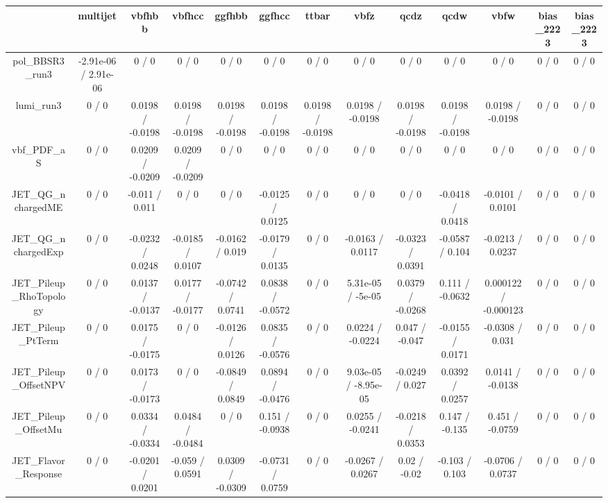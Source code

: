 \documentclass[10pt]{article}
\begin{document}
\begin{table}[htbp]
\begin{center}
\begin{tabular}{|c|c|c|c|c|c|c|c|c|c|c|c|c|}
\hline 
      & multijet      & vbfhbb      & vbfhcc      & ggfhbb      & ggfhcc      & ttbar      & vbfz      & qcdz      & qcdw      & vbfw      & bias_2223      & bias_2223 \\ 
\hline 
  pol_BBSR3_run3 & -2.91e-06 / 2.91e-06 & 0 / 0 & 0 / 0 & 0 / 0 & 0 / 0 & 0 / 0 & 0 / 0 & 0 / 0 & 0 / 0 & 0 / 0 & 0 / 0 & 0 / 0 \\ 
  lumi_run3 & 0 / 0 & 0.0198 / -0.0198 & 0.0198 / -0.0198 & 0.0198 / -0.0198 & 0.0198 / -0.0198 & 0.0198 / -0.0198 & 0.0198 / -0.0198 & 0.0198 / -0.0198 & 0.0198 / -0.0198 & 0.0198 / -0.0198 & 0 / 0 & 0 / 0 \\ 
  vbf_PDF_aS & 0 / 0 & 0.0209 / -0.0209 & 0.0209 / -0.0209 & 0 / 0 & 0 / 0 & 0 / 0 & 0 / 0 & 0 / 0 & 0 / 0 & 0 / 0 & 0 / 0 & 0 / 0 \\ 
  JET_QG_nchargedME & 0 / 0 & -0.011 / 0.011 & 0 / 0 & 0 / 0 & -0.0125 / 0.0125 & 0 / 0 & 0 / 0 & 0 / 0 & -0.0418 / 0.0418 & -0.0101 / 0.0101 & 0 / 0 & 0 / 0 \\ 
  JET_QG_nchargedExp & 0 / 0 & -0.0232 / 0.0248 & -0.0185 / 0.0107 & -0.0162 / 0.019 & -0.0179 / 0.0135 & 0 / 0 & -0.0163 / 0.0117 & -0.0323 / 0.0391 & -0.0587 / 0.104 & -0.0213 / 0.0237 & 0 / 0 & 0 / 0 \\ 
  JET_Pileup_RhoTopology & 0 / 0 & 0.0137 / -0.0137 & 0.0177 / -0.0177 & -0.0742 / 0.0741 & 0.0838 / -0.0572 & 0 / 0 & 5.31e-05 / -5e-05 & 0.0379 / -0.0268 & 0.111 / -0.0632 & 0.000122 / -0.000123 & 0 / 0 & 0 / 0 \\ 
  JET_Pileup_PtTerm & 0 / 0 & 0.0175 / -0.0175 & 0 / 0 & -0.0126 / 0.0126 & 0.0835 / -0.0576 & 0 / 0 & 0.0224 / -0.0224 & 0.047 / -0.047 & -0.0155 / 0.0171 & -0.0308 / 0.031 & 0 / 0 & 0 / 0 \\ 
  JET_Pileup_OffsetNPV & 0 / 0 & 0.0173 / -0.0173 & 0 / 0 & -0.0849 / 0.0849 & 0.0894 / -0.0476 & 0 / 0 & 9.03e-05 / -8.95e-05 & -0.0249 / 0.027 & 0.0392 / 0.0257 & 0.0141 / -0.0138 & 0 / 0 & 0 / 0 \\ 
  JET_Pileup_OffsetMu & 0 / 0 & 0.0334 / -0.0334 & 0.0484 / -0.0484 & 0 / 0 & 0.151 / -0.0938 & 0 / 0 & 0.0255 / -0.0241 & -0.0218 / 0.0353 & 0.147 / -0.135 & 0.451 / -0.0759 & 0 / 0 & 0 / 0 \\ 
  JET_Flavor_Response & 0 / 0 & -0.0201 / 0.0201 & -0.059 / 0.0591 & 0.0309 / -0.0309 & -0.0731 / 0.0759 & 0 / 0 & -0.0267 / 0.0267 & 0.02 / -0.02 & -0.103 / 0.103 & -0.0706 / 0.0737 & 0 / 0 & 0 / 0 \\ 

\end{tabular}
\end{center}
\end{table}
\end{document}
